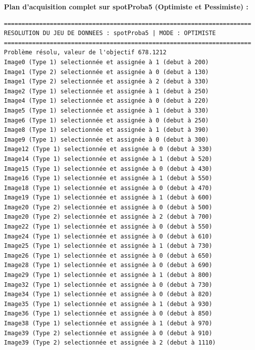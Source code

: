 \documentclass[8pt]{article}
\begin{document}
\textbf{Plan d'acquisition complet sur spotProba5 (Optimiste et Pessimiste) :}
\begin{verbatim}
======================================================================
RESOLUTION DU JEU DE DONNEES : spotProba5 | MODE : OPTIMISTE
======================================================================
Problème résolu, valeur de l'objectif 678.1212
Image0 (Type 1) selectionnée et assignée à 1 (debut à 200)
Image1 (Type 2) selectionnée et assignée à 0 (debut à 130)
Image1 (Type 2) selectionnée et assignée à 2 (debut à 330)
Image2 (Type 1) selectionnée et assignée à 1 (debut à 250)
Image4 (Type 1) selectionnée et assignée à 0 (debut à 220)
Image5 (Type 1) selectionnée et assignée à 1 (debut à 330)
Image6 (Type 1) selectionnée et assignée à 0 (debut à 250)
Image8 (Type 1) selectionnée et assignée à 1 (debut à 390)
Image9 (Type 1) selectionnée et assignée à 0 (debut à 300)
Image12 (Type 1) selectionnée et assignée à 0 (debut à 330)
Image14 (Type 1) selectionnée et assignée à 1 (debut à 520)
Image15 (Type 1) selectionnée et assignée à 0 (debut à 430)
Image16 (Type 1) selectionnée et assignée à 1 (debut à 550)
Image18 (Type 1) selectionnée et assignée à 0 (debut à 470)
Image19 (Type 1) selectionnée et assignée à 1 (debut à 600)
Image20 (Type 2) selectionnée et assignée à 0 (debut à 500)
Image20 (Type 2) selectionnée et assignée à 2 (debut à 700)
Image22 (Type 1) selectionnée et assignée à 0 (debut à 550)
Image24 (Type 1) selectionnée et assignée à 0 (debut à 610)
Image25 (Type 1) selectionnée et assignée à 1 (debut à 730)
Image26 (Type 1) selectionnée et assignée à 0 (debut à 650)
Image28 (Type 1) selectionnée et assignée à 0 (debut à 690)
Image29 (Type 1) selectionnée et assignée à 1 (debut à 800)
Image32 (Type 1) selectionnée et assignée à 0 (debut à 730)
Image34 (Type 1) selectionnée et assignée à 0 (debut à 820)
Image35 (Type 1) selectionnée et assignée à 1 (debut à 930)
Image36 (Type 1) selectionnée et assignée à 0 (debut à 850)
Image38 (Type 1) selectionnée et assignée à 1 (debut à 970)
Image39 (Type 2) selectionnée et assignée à 0 (debut à 910)
Image39 (Type 2) selectionnée et assignée à 2 (debut à 1110)


\end{verbatim}
\end{document}
